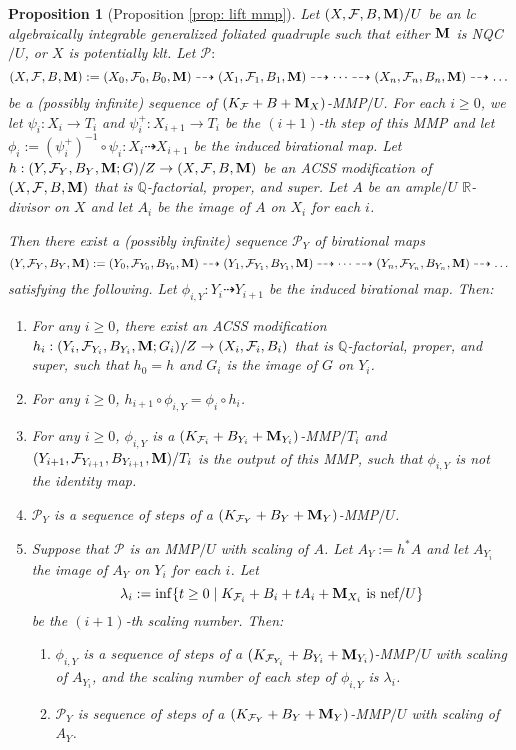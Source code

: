 \documentclass[11pt]{amsart}
\numberwithin{equation}{section}
\newcommand{\Mm}{{\bf{M}}}
\newcommand{\Qq}{\mathbb{Q}}
\newcommand{\Rr}{\mathbb{R}}
\newcommand{\Ff}{\mathcal{F}}
\newtheorem{prop}[thm]{Proposition}
\theoremstyle{definition}
\theoremstyle{definition}
\theoremstyle{definition}
\begin{document}
\begin{prop}[Proposition \ref{prop: lift mmp}]\label{prop: lift mmp gfq}
    Let $(X,\Ff,B,\Mm)/U$ be an lc algebraically integrable generalized foliated quadruple such that either $\Mm$ is NQC$/U$, or $X$ is potentially klt. Let $\mathcal{P}:$
$$(X,\Ff,B,\Mm):=(X_0,\Ff_0,B_0,\Mm)\dashrightarrow (X_1,\Ff_1,B_1,\Mm)\dashrightarrow\dots\dashrightarrow (X_n,\Ff_n,B_n,\Mm)\dashrightarrow\dots$$
be a (possibly infinite) sequence of $(K_{\Ff}+B+\Mm_X)$-MMP$/U$. For each $i\geq 0$, we let $\psi_i: X_i\rightarrow T_i$ and $\psi_i^+:X_{i+1}\rightarrow T_{i}$ be the $(i+1)$-th step of this MMP and let $\phi_i:=(\psi_{i}^+)^{-1}\circ\psi_i: X_i\dashrightarrow X_{i+1}$ be the induced birational map. Let $h: (Y,\Ff_Y,B_Y,\Mm;G)/Z\rightarrow (X,\Ff,B,\Mm)$ be an ACSS modification of $(X,\Ff,B,\Mm)$ that is $\Qq$-factorial, proper, and super. Let $A$ be an ample$/U$ $\Rr$-divisor on $X$ and let $A_i$ be the image of $A$ on $X_i$ for each $i$.

Then there exist a (possibly infinite) sequence $\mathcal{P}_Y$ of birational maps 
$$(Y,\Ff_Y,B_Y,\Mm):=(Y_0,\Ff_{Y_0},B_{Y_0},\Mm)\dashrightarrow (Y_1,\Ff_{Y_1},B_{Y_1},\Mm)\dashrightarrow\dots\dashrightarrow (Y_n,\Ff_{Y_n},B_{Y_n},\Mm)\dashrightarrow\dots$$
satisfying the following. Let $\phi_{i,Y}: Y_i\dashrightarrow Y_{i+1}$ be the induced birational map. Then:
\begin{enumerate}
\item For any $i\geq 0$, there exist an ACSS modification $h_i: (Y_i,\Ff_{Y_i},B_{Y_i},\Mm;G_i)/Z\rightarrow (X_i,\Ff_i,B_i)$ that is $\Qq$-factorial, proper, and super, such that $h_0=h$ and $G_i$ is the image of $G$ on $Y_i$.
\item For any $i\geq 0$, $h_{i+1}\circ\phi_{i,Y}=\phi_i\circ h_i$.
\item For any $i\geq 0$, $\phi_{i,Y}$ is a $(K_{\Ff_i}+B_{Y_i}+\Mm_{Y_i})$-MMP$/T_i$ and $(Y_{i+1},\Ff_{Y_{i+1}},B_{Y_{i+1}},\Mm)/T_i$ is the output of this MMP, such that $\phi_{i,Y}$ is not the identity map.
\item $\mathcal{P}_Y$ is a sequence of steps of a $(K_{\Ff_Y}+B_Y+\Mm_Y)$-MMP$/U$.
\item Suppose that $\mathcal{P}$ is an MMP$/U$ with scaling of $A$. Let $A_{Y}:=h^*A$ and let $A_{Y_i}$ the image of $A_Y$ on $Y_i$ for each $i$. Let
$$\lambda_i:=\inf\{t\geq 0\mid K_{\Ff_i}+B_i+tA_i+\Mm_{X_i}\text{ is nef}/U\}$$
be the $(i+1)$-th scaling number. Then:
\begin{enumerate}
    \item $\phi_{i,Y}$ is a sequence of steps of a $(K_{\Ff_{Y_i}}+B_{Y_i}+\Mm_{Y_i})$-MMP$/U$ with scaling of $A_{Y_i}$, and the scaling number of each step of $\phi_{i,Y}$ is $\lambda_i$.
    \item $\mathcal{P}_Y$ is sequence of steps of a $(K_{\Ff_Y}+B_Y+\Mm_Y)$-MMP$/U$ with scaling of $A_Y$.
\end{enumerate}
\end{enumerate}
\end{prop}
\end{document}
